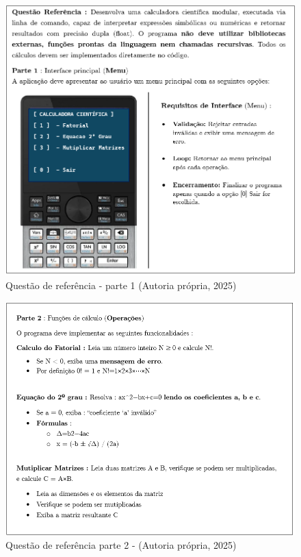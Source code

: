 \begin{figure}[ht]
	\centering
	\includegraphics[width=12cm]{./imagens/capitulo4/questao-referencia-1.png}
	\caption{Questão de referência - parte 1 (Autoria própria, 2025)}
	\label{fig:questao-referencia-part-2}
\end{figure}


\begin{figure}[ht]
    \centering
    \includegraphics[width=12cm]{./imagens/capitulo4/questao-referencia-2.png}
    \caption{Questão de referência parte 2 - (Autoria própria, 2025)}
    \label{fig:questao-referencia-part-2}
\end{figure}

